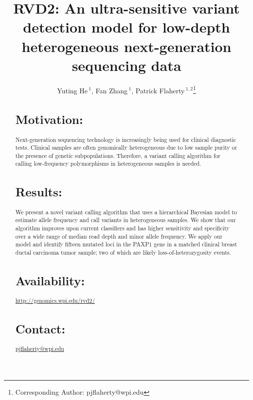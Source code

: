 \documentclass{bioinfo}
\begin{document}

\title[RVD2]{RVD2: An ultra-sensitive variant detection model for low-depth heterogeneous next-generation sequencing data}
\author[He \textit{et~al}]{Yuting He\,$^{1}$, Fan Zhang\,$^{1}$, Patrick Flaherty\,$^{1,2}$\footnote{Corresponding Author: pjflaherty@wpi.edu}}
\address{$^{1}$Department of Biomedical Engineering, Worcester Polytechnic Institute, Worcester, MA, USA\\
$^{2}$Department of Mathematics and Statistics, University of Massachusetts, Amherst, MA, USA}



\maketitle

\begin{abstract}

\section{Motivation:}Next-generation sequencing technology is increasingly being used for clinical diagnostic tests. Clinical samples are often genomically heterogeneous due to low sample purity or the presence of genetic subpopulations. Therefore, a variant calling algorithm for calling low-frequency polymorphisms in heterogeneous samples is needed.

\section{Results:}We present a novel variant calling algorithm that uses a hierarchical Bayesian model to estimate allele frequency and call variants in heterogeneous samples. We show that our algorithm improves upon current classifiers and has higher sensitivity and specificity over a wide range of median read depth and minor allele frequency. We apply our model and identify fifteen mutated loci in the PAXP1 gene in a matched clinical breast ductal carcinoma tumor sample; two of which are likely loss-of-heterozygosity events.


\section{Availability:}
\href{http://genomics.wpi.edu/rvd2/}{http://genomics.wpi.edu/rvd2/}

\section{Contact:} \href{pjflaherty@wpi.edu}{pjflaherty@wpi.edu}
\end{abstract}
\end{document}
